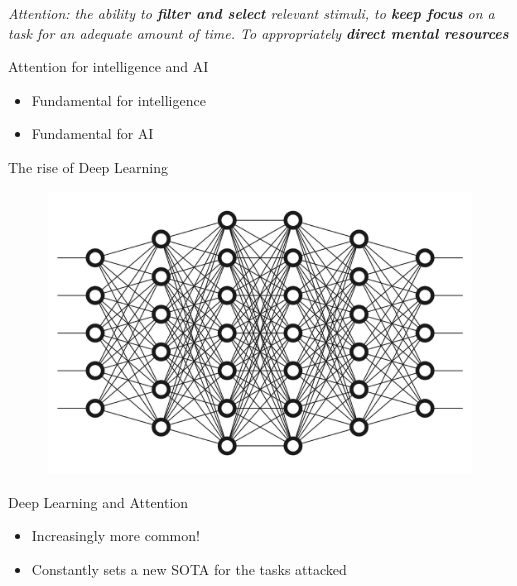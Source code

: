 \documentclass[10pt]{beamer}
\begin{document}
\begin{frame}{}
    \centering
    \textit{Attention: the ability to \textbf{filter and select} relevant stimuli,
        to \textbf{keep focus} on a task for an adequate amount of time.
        To appropriately \textbf{direct mental resources}}
\end{frame}

\begin{frame}{Attention for intelligence and AI}
    \begin{itemize}
        \item Fundamental for intelligence
        \item Fundamental for AI
    \end{itemize}
\end{frame}

\begin{frame}{The rise of Deep Learning}
    \begin{figure}
        \centering
        \includegraphics[width=1.0\linewidth]{./img/dl2.jpeg}
    \end{figure}
\end{frame}


\begin{frame}{Deep Learning and Attention}
    \begin{itemize}
        \item Increasingly more common!
        \item Constantly sets a new SOTA for the tasks attacked
    \end{itemize}
\end{frame}
\end{document}
